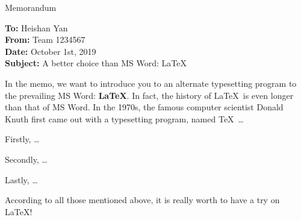 \documentclass[12pt]{ctexart}
\begin{document}
\begin{letter}{Memorandum}
  \begin{flushleft}  %
    \textbf{To:} Heishan Yan\\
    \textbf{From:} Team 1234567\\
    \textbf{Date:} October 1st, 2019\\
    \textbf{Subject:} A better choice than MS Word: \LaTeX
  \end{flushleft}

  In the memo, we want to introduce you to an alternate typesetting program to the prevailing MS Word: \textbf{\LaTeX}. In fact, the history of \LaTeX\ is even longer than that of MS Word. In the 1970s, the famous computer scientist Donald Knuth first came out with a typesetting program,  named \TeX\ \ldots

  Firstly, \ldots

  Secondly, \ldots

  Lastly, \ldots

  According to all those mentioned above, it is really worth to have a try on \LaTeX!
\end{letter}





\begin{center}
\end{center}
\end{document}
